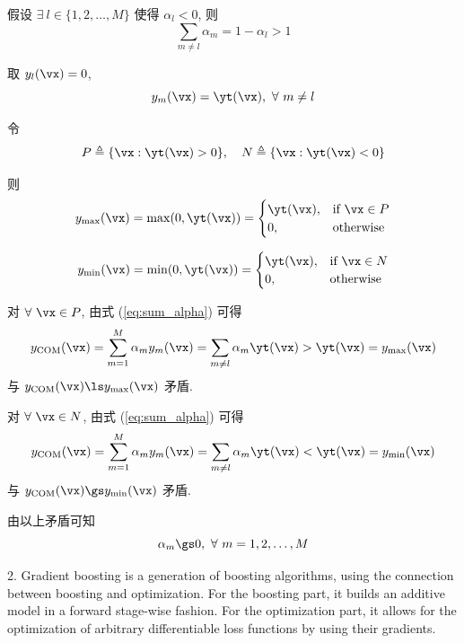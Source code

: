 \documentclass[openany]{ctexbook}
\theoremstyle{kaiti}
\theoremstyle{normal}
\begin{document}
假设 $\exists~l\in\{1,2,\dots,M\}$ 使得 $\alpha_l<0$, 则
\begin{equation}
  \sum_{m\neq l}\alpha_m=1-\alpha_l>1
  \label{eq:sum_alpha}
\end{equation}

取 $y_l(\vx)=0$, 
\begin{equation}
  y_m(\vx)=\yt(\vx),~\forall~m\neq l
\end{equation}

令
\begin{equation}
  P\triangleq\{\vx:\yt(\vx)>0\},\quad
  N\triangleq\{\vx:\yt(\vx)<0\}
\end{equation}

则
\begin{equation}
  y_{\max}(\vx)=\max(0,\yt(\vx))
  =\begin{cases}
    \yt(\vx), &\text{if}~\vx\in P\\
    0, &\text{otherwise}\\
  \end{cases}
\end{equation}

\begin{equation}
  y_{\min}(\vx)=\min(0,\yt(\vx))
  =\begin{cases}
    \yt(\vx), &\text{if}~\vx\in N\\
    0, &\text{otherwise}\\
  \end{cases}
\end{equation}

对 $\forall~\vx\in P$, 由式 (\ref{eq:sum_alpha}) 可得
\begin{equation}
  y_{\text{COM}}(\vx)
  =\sum_{m=1}^{M}\alpha_{m}y_{m}(\vx)
  =\sum_{m\neq l}\alpha_{m}\yt(\vx)
  >\yt(\vx)=y_{\max}(\vx)
\end{equation}
与 $y_{\text{COM}}(\vx)\ls y_{\max}(\vx)$ 矛盾.

对 $\forall~\vx\in N$, 由式 (\ref{eq:sum_alpha}) 可得
\begin{equation}
  y_{\text{COM}}(\vx)
  =\sum_{m=1}^{M}\alpha_{m}y_{m}(\vx)
  =\sum_{m\neq l}\alpha_{m}\yt(\vx)
  <\yt(\vx)=y_{\min}(\vx)
\end{equation}
与 $y_{\text{COM}}(\vx)\gs y_{\min}(\vx)$ 矛盾.

由以上矛盾可知
\begin{equation}
  \alpha_{m}\gs0,~\forall~m=1,2,\dots,M
\end{equation}

2. Gradient boosting is a generation of boosting algorithms, using the connection between boosting and optimization. For the boosting part, it builds an additive model in a forward stage-wise fashion. For the optimization part, it allows for the optimization of arbitrary differentiable loss functions by using their gradients.
\end{document}

